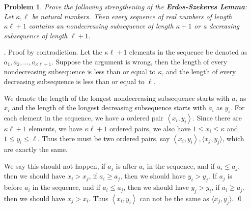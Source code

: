 \documentclass[12pt]{article}
\newtheorem{hw}{Problem}
\newenvironment{sol}
  {\par\vspace{3mm}\noindent{\it Solution}.}
  {\qed}
\begin{document}
 \begin{hw}
 Prove the following strengthening of the \textbf{Erd$\ddot{o}$s-Szekeres Lemma}: Let $\kappa,\ell$ be natural numbers. Then every sequence of real numbers of length $\kappa\ell
 +1$ contains an nondecreasing subsequence of length $\kappa+1$ or a decreasing subsequence of length $\ell+1$.
 \end{hw}
 \begin{sol}
 	Proof by contradiction. Let the $\kappa\ell + 1$ elements in the sequence be denoted as $a_{1}, a_{2}, \dots, a_{\kappa\ell +1}$. Suppose the argument is wrong, then the length of every nondecreasing subsequence is less than or equal to $\kappa$, and the length of every decreasing subsequence is less than or equal to $\ell$. 
 	
 	We denote the length of the longest nondecreasing subsequence starts with $a_{i}$ as $x_{i}$ and the length of the longest decreasing subsequence starts with $a_{i}$ as $y_{i}$. For each element in the sequence, we have a ordered pair $\left\langle x_{i}, y_{i}\right\rangle$. Since there are $\kappa\ell + 1$ elements, we have $\kappa\ell + 1$ ordered pairs, we also have $1 \leq x_{i} \leq \kappa$ and $1 \leq y_{i} \leq \ell$. Thus there must be two ordered pairs, say $\left\langle x_{i}, y_{i}\right\rangle, \langle x_{j}, y_{j}\rangle$, which are exactly the same. 
 	
 	We say this should not happen, if $a_{j}$ is after $a_{i}$ in the sequence, and if $a_{i} \leq a_{j}$, then we should have $x_{i} > x_{j}$, if $a_{i} \geq a_{j}$, then we should have $y_{i} > y_{j}$. If $a_{j}$ is before $a_{i}$ in the sequence, and if $a_{i} \leq a_{j}$, then we should have $y_{j} > y_{i}$, if $a_{i} \geq a_{j}$, then we should have $x_{j} > x_{i}$. Thus $\left\langle x_{i}, y_{i}\right\rangle$ can not be the same as $\langle x_{j}, y_{j}\rangle$.
 \end{sol}
\end{document}
